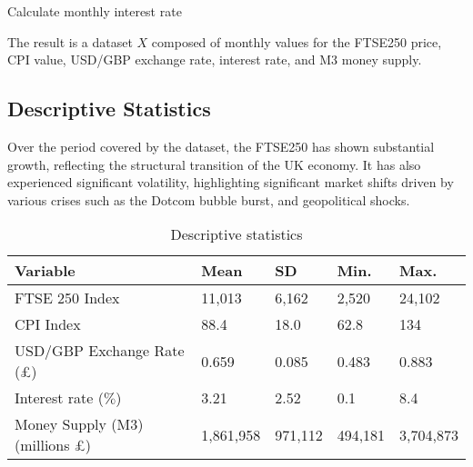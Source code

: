\documentclass[11pt,a4paper]{article}
\begin{document}
\begin{algorithm}[H]
    \caption{Calculate monthly interest rate}
    \label{alg:interest_rate_adjustment}
    
\end{algorithm}

The result is a dataset $X$ composed of monthly values for the FTSE250
price, CPI value, USD/GBP exchange rate, interest rate, and M3 money supply. 

\subsection{Descriptive Statistics}

Over the period covered by the dataset, the FTSE250 has 
shown substantial growth, reflecting the structural transition of the UK economy.
It has also experienced significant volatility, highlighting significant market shifts driven by 
various crises such as the Dotcom bubble burst, and geopolitical shocks.

\begin{table}[h!]
    \centering
    \caption{Descriptive statistics}
    \begin{tabular}{lllll}
        \toprule
        \textbf{Variable} & \textbf{Mean} & \textbf{SD} &  \textbf{Min.} & \textbf{Max.}\\
        \midrule
        FTSE 250 Index &  11,013 & 6,162 & 2,520 & 24,102 \\
        CPI Index &  88.4 & 18.0 & 62.8 & 134 \\
        USD/GBP Exchange Rate (£) &  0.659 & 0.085 & 0.483 & 0.883 \\
        Interest rate ($\%$) &  3.21 & 2.52 & 0.1 & 8.4 \\
        Money Supply (M3) (millions £) &  1,861,958 & 971,112 & 494,181 & 3,704,873 \\
        \bottomrule
    \end{tabular}
\end{table}
\end{document}
